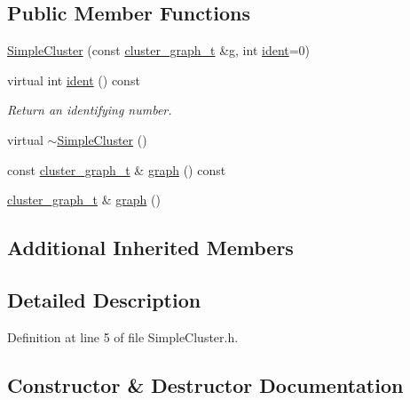 \subsection*{Public Member Functions}
\begin{DoxyCompactItemize}
\item 
\hyperlink{class_wire_cell_1_1_simple_cluster_a87ba6616ee54aff6096304aa4a5ba45b}{Simple\+Cluster} (const \hyperlink{namespace_wire_cell_a6a9ecba14dfba50cdb081820a8bcacbe}{cluster\+\_\+graph\+\_\+t} \&g, int \hyperlink{class_wire_cell_1_1_simple_cluster_a2566bb51599fbf833d85bcc359d20c82}{ident}=0)
\item 
virtual int \hyperlink{class_wire_cell_1_1_simple_cluster_a2566bb51599fbf833d85bcc359d20c82}{ident} () const
\begin{DoxyCompactList}\small\item\em Return an identifying number. \end{DoxyCompactList}\item 
virtual \hyperlink{class_wire_cell_1_1_simple_cluster_adaa76b013ba458a8dff10877d456fc6f}{$\sim$\+Simple\+Cluster} ()
\item 
const \hyperlink{namespace_wire_cell_a6a9ecba14dfba50cdb081820a8bcacbe}{cluster\+\_\+graph\+\_\+t} \& \hyperlink{class_wire_cell_1_1_simple_cluster_a0a501609a8aeb248675486855c3afb39}{graph} () const
\item 
\hyperlink{namespace_wire_cell_a6a9ecba14dfba50cdb081820a8bcacbe}{cluster\+\_\+graph\+\_\+t} \& \hyperlink{class_wire_cell_1_1_simple_cluster_a45b02f38acf12241504ec515a7d25e32}{graph} ()
\end{DoxyCompactItemize}
\subsection*{Additional Inherited Members}


\subsection{Detailed Description}


Definition at line 5 of file Simple\+Cluster.\+h.



\subsection{Constructor \& Destructor Documentation}
\mbox{\label{class_wire_cell_1_1_simple_cluster_a87ba6616ee54aff6096304aa4a5ba45b}} 
